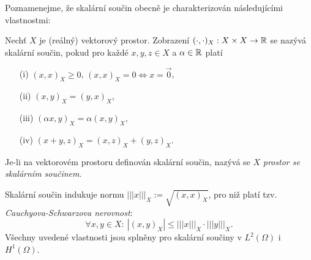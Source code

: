 
Poznamenejme, že skalární součin obecně je charakterizován následujícími vlastnostmi:
\begin{df}
Nechť $X$ je (reálný) vektorový prostor. Zobrazení $(\cdot,\cdot)_X:X\times X\rightarrow\mathbb R$ se nazývá skalární součin, pokud pro každé $x,y,z\in X$ a $\alpha\in\mathbb R$ platí
\begin{itemize}
\item[(i)] $(x,x)_X\ge 0$, $(x,x)_X=0\Leftrightarrow x=\vec 0$,
\item[(ii)] $(x,y)_X=(y,x)_X$,
\item[(iii)] $(\alpha x,y)_X=\alpha(x,y)_X$,
\item[(iv)] $(x+y,z)_X=(x,z)_X+(y,z)_X$.
\end{itemize}
Je-li na vektorovém prostoru definován skalární součin, nazývá se $X$ \emph{prostor se skalárním součinem}.
\end{df}
Skalární součin indukuje normu $|||x|||_X:=\sqrt{(x,x)_X}$,
pro niž platí tzv. \emph{Cauchyova-Schwarzova nerovnost}:
\[ \forall x,y\in X: ~|(x,y)_X| \le |||x|||_X\cdot|||y|||_X. \]
Všechny uvedené vlastnosti jsou splněny pro skalární součiny v $L^2(\Omega)$ i $H^1(\Omega)$.








% 
% 


